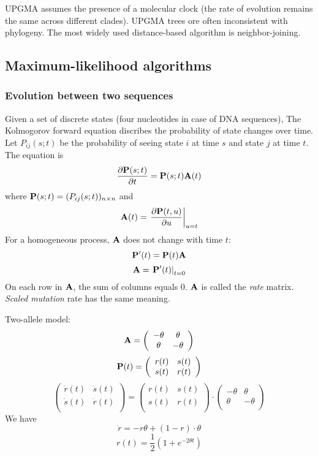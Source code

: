 \documentclass[10pt]{article}
\begin{document}
UPGMA assumes the presence of a molecular clock (the rate of evolution remains
the same across different clades). UPGMA trees ore often inconsistent with
phylogeny. The most widely used distance-based algorithm is neighbor-joining.

\subsection{Maximum-likelihood algorithms}

\subsubsection{Evolution between two sequences}

Given a set of discrete states (four nucleotides in case of DNA sequences),
The Kolmogorov forward equation discribes the probability of state changes over
time. Let $P_{ij}(s;t)$ be the probability of seeing state $i$ at time $s$ and
state $j$ at time $t$. The equation is
\[
\frac{\partial {\bf P}(s;t)}{\partial t}={\bf P}(s;t){\bf A}(t)
\]
where ${\bf P}(s;t)=(P_{ij}(s;t))_{n\times n}$ and
\[
{\bf A}(t)=\left.\frac{\partial {\bf P}(t,u)}{\partial u}\right|_{u=t}
\]
For a homogeneous process, ${\bf A}$ does not change with time $t$:
\[
{\bf P}'(t)={\bf P}(t){\bf A}
\]
\[
{\bf A}=\left.{\bf P}'(t)\right|_{t=0}
\]
On each row in ${\bf A}$, the sum of columns equals 0. ${\bf A}$ is called the
\emph{rate} matrix. \emph{Scaled mutation} rate has the same meaning.

Two-allele model:
\[
{\bf A}=\left(\begin{array}{cccc}
-\theta & \theta \\
\theta & -\theta \\
\end{array}\right)
\]
\[
{\bf P}(t)=\left(\begin{array}{cc}
r(t) & s(t) \\
s(t) & r(t) \\
\end{array}\right)
\]
\[
\left(\begin{array}{cc}
\dot{r}(t) & \dot{s}(t) \\
\dot{s}(t) & \dot{r}(t) \\
\end{array}\right)
=
\left(\begin{array}{cc}
r(t) & s(t) \\
s(t) & r(t) \\
\end{array}\right)
\cdot
\left(\begin{array}{cc}
-\theta & \theta \\
\theta & -\theta \\
\end{array}\right)
\]
We have
$$
\dot{r}=-r\theta+(1-r)\cdot\theta
$$
\[
r(t)=\frac{1}{2}\left(1+e^{-2\theta t}\right)
\]
\end{document}
